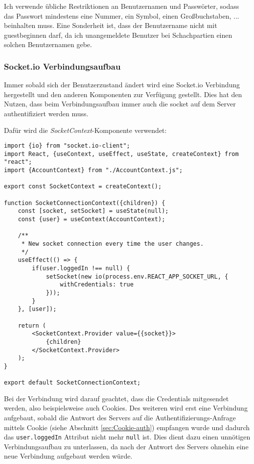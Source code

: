 Ich verwende übliche Restriktionen an Benutzernamen und Passwörter, sodass das Passwort mindestens eine Nummer, ein Symbol, einen Großbuchstaben, ... beinhalten muss. Eine Sonderheit ist, dass der Benutzername nicht mit \glqq guest\grqq{ }beginnen darf, da ich unangemeldete Benutzer bei Schachpartien einen solchen Benutzernamen gebe. 


\subsubsection{Socket.io Verbindungsaufbau}
\label{sec:socket-Verbindung}
Immer sobald sich der Benutzerzustand ändert wird eine Socket.io Verbindung hergestellt und den anderen Komponenten zur Verfügung gestellt. Dies hat den Nutzen, dass beim Verbindungsaufbau immer auch die socket auf dem Server authentifiziert werden muss.

Dafür wird die \textit{SocketContext}-Komponente verwendet:

\begin{lstlisting}[style=codeStyle, caption={Die Datei \textit{SocketContext.js}}, label={lst:SocketContext}]
import {io} from "socket.io-client";
import React, {useContext, useEffect, useState, createContext} from "react";
import {AccountContext} from "./AccountContext.js";

export const SocketContext = createContext();

function SocketConnectionContext({children}) {
    const [socket, setSocket] = useState(null);
    const {user} = useContext(AccountContext);

    /**
     * New socket connection every time the user changes.
     */
    useEffect(() => {
        if(user.loggedIn !== null) {
            setSocket(new io(process.env.REACT_APP_SOCKET_URL, {
                withCredentials: true
            }));
        }
    }, [user]);

    return (
        <SocketContext.Provider value={{socket}}>
            {children}
        </SocketContext.Provider>
    );
}

export default SocketConnectionContext;
\end{lstlisting}

Bei der Verbindung wird darauf geachtet, dass die Credentials mitgesendet werden, also beispielsweise auch Cookies. Des weiteren wird erst eine Verbindung aufgebaut, sobald die Antwort des Servers auf die Authentifizierungs-Anfrage mittels Cookie (siehe Abschnitt \ref{sec:Cookie-auth}) empfangen wurde und dadurch das \verb|user.loggedIn| Attribut nicht mehr \verb|null| ist. Dies dient dazu einen unnötigen Verbindungsaufbau zu unterlassen, da nach der Antwort des Servers ohnehin eine neue Verbindung aufgebaut werden würde.

